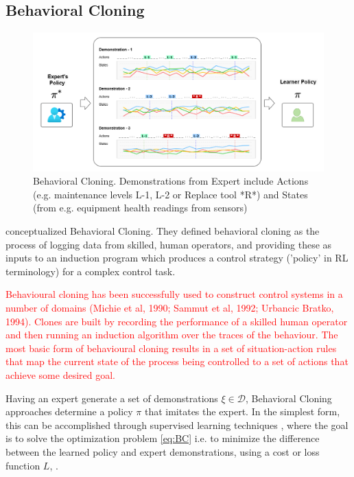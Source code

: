 \documentclass{article}
\begin{document}
\subsection{Behavioral Cloning}
\begin{figure}
	\centering
	\includegraphics[width=\linewidth]{images/BC_Diagram.png}
	\caption{Behavioral Cloning. Demonstrations from Expert include Actions (e.g. maintenance levels L-1, L-2 or Replace tool *R*) and States (from e.g. equipment health readings from sensors)}
	\label{fig:BC}
\end{figure}

\cite{BC-bain1995} conceptualized Behavioral Cloning. They defined behavioral cloning as the process of logging data from skilled, human operators, and providing these as inputs to an induction program which produces a control strategy ('policy' in RL terminology) for a complex control task.

\textcolor{red}{Behavioural cloning has been successfully used to construct control systems in a number of domains (Michie et al, 1990; Sammut et al, 1992; Urbancic Bratko, 1994). Clones are built by recording the performance of a skilled
human operator and then running an induction algorithm over the traces
of the behaviour. The most basic form of behavioural cloning results in a
set of situation-action rules that map the current state of the process being
controlled to a set of actions that achieve some desired goal.}

Having an expert generate a set of demonstrations $\xi \in \mathcal{D}$, Behavioral Cloning approaches determine a policy $\pi$ that imitates the expert. In the simplest form, this can be accomplished through supervised learning techniques \citep{abbeel2004apprenticeship, yue2018imitation}, where the goal is to solve the optimization problem \eqref{eq:BC} i.e. to minimize the difference between the learned policy and expert demonstrations, using a cost or loss function $L$, \citep{stanford-lectures}.  
\end{document}
